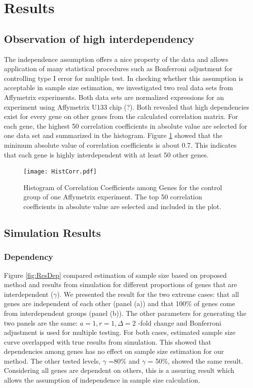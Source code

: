 \documentclass{bioinfo}
\begin{document}
\section{Results}

\subsection{Observation of high interdependency}
The independence assumption offers a nice property of the data and
allows application of many statistical procedures such as
Bonferroni adjustment for controlling type I error for multiple
test. In checking whether this assumption is acceptable in sample
size estimation, we investigated two real data sets from
Affymetrix experiments. Both data sets are normalized expressions
for an experiment using Affymetrix U133 chip (?). Both revealed
that high dependencies exist for every gene on other genes from
the calculated correlation matrix. For each gene, the highest 50
correlation coefficients in absolute value are selected for one
data set and summarized in the histogram. Figure
\ref{fig:HistCorr} showed that the minimum absolute value of
correlation coefficients is about 0.7. This indicates that each
gene is highly interdependent with at least 50 other genes.

\begin{figure}[h]
  \centerline{\texttt{[image: HistCorr.pdf]}}
  \caption[Histogram of Correlation Coefficients among Genes]
  {Histogram of Correlation Coefficients among Genes for the control group of one Affymetrix
    experiment. The top 50 correlation coefficients in absolute value are selected and included in the plot.}
  \label{fig:HistCorr}
\end{figure}

\subsection{Simulation Results}

\subsubsection{Dependency}

Figure \ref{fig:ResDep} compared estimation of sample size based
on proposed method and results from simulation for different
proportions of genes that are interdependent ($\gamma$). We
presented the result for the two extreme cases: that all genes are
independent of each other (panel (a)) and that 100\% of genes come
from interdependent groups (panel (b)). The other parameters for
generating the two panels are the same: $a = 1, r = 1, \Delta = 2$
-fold change and Bonferroni adjustment is used for multiple
testing. For both cases, estimated sample size curve overlapped
with true results from simulation. This showed that dependencies
among genes has no effect on sample size estimation for our
method. The other tested levels, $\gamma$ =80\% and $\gamma$ =
50\%, showed the same result. Considering all genes are dependent
on others, this is a assuring result which allows the assumption
of independence in sample size calculation.
\end{document}
